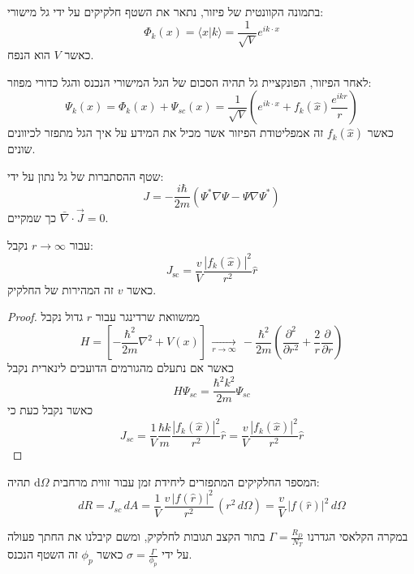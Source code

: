 \documentclass{tstextbook}
\begin{document}
\begin{proposition}
בתמונה הקוונטית של פיזור, נתאר את השטף חלקיקים על ידי גל מישורי:
$$\Phi_{k}(x)=\langle x|k\rangle=\frac{1}{\sqrt{V}}e^{i k\cdot x}$$
כאשר \(V\) הוא הנפח.

\end{proposition}
\begin{proposition}
לאחר הפיזור, הפונקציית גל תהיה הסכום של הגל המישורי הנכנס והגל כדורי מפוזר:
$$\Psi_{k}(x)=\Phi_{k}(x)+\Psi_{s c}(x)=\frac{1}{\sqrt{{V}}}\left(e^{i k\cdot x}+f_{k}(\hat{x})\frac{e^{i k r}}{r}\right)$$
כאשר \(f_{k}\left( \hat{x} \right)\) זה אמפליטודת הפיזור אשר מכיל את המידע על איך הגל מתפזר לכיוונים שונים.

\end{proposition}
\begin{reminder}
שטף ההסתברות של גל נתון על ידי:
$$J=-\frac{i\hbar}{2m}\left(\Psi^{*}\nabla\Psi-\Psi\nabla\Psi^{*}\right)$$
כך שמקיים \(\bar{\nabla} \cdot \vec{J}=0\).

\end{reminder}
\begin{proposition}
עבור \(r\to \infty\) נקבל:
$$J_{\mathrm{sc}}=\frac{v}{{V}}\frac{|f_{k}\left( \hat{x} \right)|^{2}}{r^{2}}\hat{r}$$
כאשר \(v\) זה המהירות של החלקיק.

\end{proposition}
\begin{proof}
ממשוואת שרדינגר עבור \(r\) גדול נקבל
$$H=\left[-\frac{\hbar^{2}}{2m}\nabla^{2}+V(x)\right]\,\xrightarrow[r\to\infty]{}\,-\frac{\hbar^{2}}{2m}\left(\frac{\partial^{2}}{\partial r^{2}}+\frac{2}{r}\frac{\partial}{\partial r}\right)$$
כאשר אם נתעלם מהגורמים הדועכים לינארית נקבל
$$H\Psi_{s c}=\frac{\hbar^{2}k^{2}}{2m}\Psi_{s c}$$
כאשר נקבל כעת כי
$$J_{s c}=\frac{1}{{V}}\frac{\hbar k}{m}\frac{|f_{k}(\hat{x})|^{2}}{r^{2}}\hat{r}=\frac{v}{{V}}\frac{|f_{k}(\hat{x})|^{2}}{r^{2}}\hat{r}$$

\end{proof}
\begin{corollary}
המספר החלקיקים המתפזרים ליחידת זמן עבור זווית מרחבית \(\mathrm{d}\Omega\) תהיה:
$$d R=J_{s c}\,d A={\frac{1}{V}}\,{\frac{v\,|f({\hat{r}})|^{2}}{r^{2}}}\,(r^{2}\,d\Omega)={\frac{v}{V}}\,|f({\hat{r}})|^{2}\,d\Omega$$

\end{corollary}
\begin{reminder}
במקרה הקלאסי הגדרנו \(\Gamma=\frac{R_{D}}{N_{T}}\) בתור הקצב תגובות לחלקיק, ומשם קיבלנו את החתך פעולה על ידי \(\sigma=\frac{\Gamma}{\phi_{p}}\) כאשר \(\phi_{p}\) זה השטף הנכנס.

\end{reminder}
\end{document}

